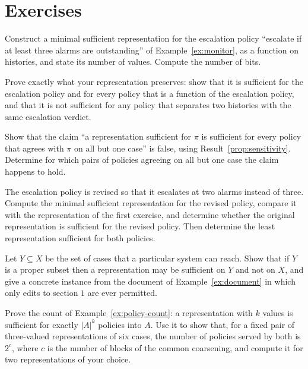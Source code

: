 \section*{Exercises}

\begin{exercise}
Construct a minimal sufficient representation for the escalation policy ``escalate if at least three alarms are outstanding'' of Example~\ref{ex:monitor}, as a function on histories, and state its number of values. Compute the number of bits.
\end{exercise}

\begin{exercise}
Prove exactly what your representation preserves: show that it is sufficient for the escalation policy and for every policy that is a function of the escalation policy, and that it is not sufficient for any policy that separates two histories with the same escalation verdict.
\end{exercise}

\begin{exercise}
Show that the claim ``a representation sufficient for $\pi$ is sufficient for every policy that agrees with $\pi$ on all but one case'' is false, using Result~\ref{prop:sensitivity}. Determine for which pairs of policies agreeing on all but one case the claim happens to hold.
\end{exercise}

\begin{exercise}
The escalation policy is revised so that it escalates at two alarms instead of three. Compute the minimal sufficient representation for the revised policy, compare it with the representation of the first exercise, and determine whether the original representation is sufficient for the revised policy. Then determine the least representation sufficient for both policies.
\end{exercise}

\begin{exercise}
Let $Y\subseteq X$ be the set of cases that a particular system can reach. Show that if $Y$ is a proper subset then a representation may be sufficient on $Y$ and not on $X$, and give a concrete instance from the document of Example~\ref{ex:document} in which only edits to section $1$ are ever permitted.
\end{exercise}


\begin{exercise}
Prove the count of Example~\ref{ex:policy-count}: a representation with $k$ values is sufficient for exactly $|A|^{k}$ policies into $A$. Use it to show that, for a fixed pair of three-valued representations of six cases, the number of policies served by both is $2^{c}$, where $c$ is the number of blocks of the common coarsening, and compute it for two representations of your choice.
\end{exercise}

